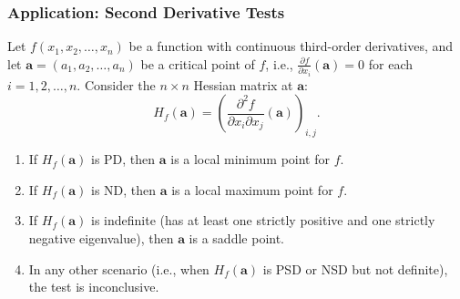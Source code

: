 \subsubsection*{Application: Second Derivative Tests}

\begin{theorem}
	Let $f(x_1, x_2, \dots, x_n)$ be a function with continuous third-order derivatives, and let $\mathbf{a} = (a_1, a_2, \dots, a_n)$ be a critical point of $f$, i.e., $\frac{\partial f}{\partial x_i}(\mathbf{a}) = 0$ for each $i = 1, 2, \dots, n$. Consider the $n \times n$ Hessian matrix at $\mathbf{a}$:
	$$
		H_f(\mathbf{a}) = \left( \frac{\partial^2 f}{\partial x_i \partial x_j}(\mathbf{a}) \right)_{i,j}.
	$$
	\begin{enumerate}
		\item If $H_f(\mathbf{a})$ is PD, then $\mathbf{a}$ is a local minimum point for $f$.
		\item If $H_f(\mathbf{a})$ is ND, then $\mathbf{a}$ is a local maximum point for $f$.
		\item If $H_f(\mathbf{a})$ is indefinite (has at least one strictly positive and one strictly negative eigenvalue), then $\mathbf{a}$ is a saddle point.
		\item In any other scenario (i.e., when $H_f(\mathbf{a})$ is PSD or NSD but not definite), the test is inconclusive.
	\end{enumerate}
\end{theorem}


